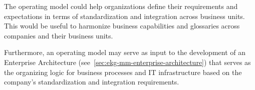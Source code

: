 %
%
The operating model could help organizations define their requirements
and expectations in terms of standardization and integration across business units.
This would be useful to harmonize business capabilities and glossaries
across companies and their business units.

Furthermore, an operating model may serve as input to the development of an Enterprise Architecture
(see~\ref{sec:ekg-mm-enterprise-architecture}) that serves as the organizing logic for business processes
and IT infrastructure based on the company’s standardization and integration requirements.

